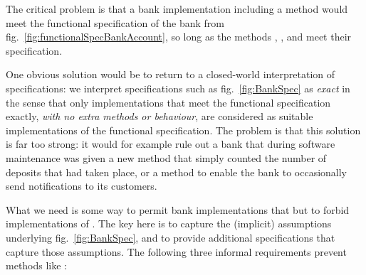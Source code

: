  
The critical problem is that a bank implementation including a 
method would meet the functional specification of the bank from
fig.~\ref{fig:functionalSpecBankAccount}, so long as the methods ,
, and     meet
their specification.

One obvious solution would be to return to a closed-world
interpretation of specifications: we interpret specifications such as
fig.~\ref{fig:BankSpec} as \emph{exact} in the sense that only
implementations that meet the functional specification exactly,
\emph{with no extra methods or behaviour}, are considered as suitable
implementations of the functional specification. The problem is that
this solution is far too strong: it would for example rule out a bank
that  during software maintenance was given a new method 
that simply counted the number of deposits that had taken place, or a method 
to enable the bank to occasionally send notifications  to its customers.
%
%


What we need is some way to permit bank implementations that 
 but to forbid implementations of . %
The key here is to capture the (implicit)
assumptions underlying fig.~\ref{fig:BankSpec}, and to provide
additional specifications that capture those assumptions.  The following
 three informal requirements   prevent methods like :

